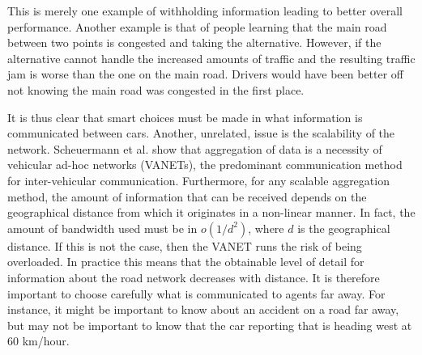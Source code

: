 \documentclass{article}
\begin{document}
This is merely one example of withholding information leading to better overall performance. Another example is that of people learning that the main road between two points is congested and taking the alternative. However, if the alternative cannot handle the increased amounts of traffic and the resulting traffic jam is worse than the one on the main road. Drivers would have been better off not knowing the main road was congested in the first place.

It is thus clear that smart choices must be made in what information is communicated between cars. Another, unrelated, issue is the scalability of the network. Scheuermann et al. \cite{Scheuermann2009} show that aggregation of data is a necessity of vehicular ad-hoc networks (VANETs), the predominant communication method for inter-vehicular communication. Furthermore, for any scalable aggregation method, the amount of information that can be received depends on the geographical distance from which it originates in a non-linear manner. In fact, the amount of bandwidth used must be in $o(1/d^2)$, where $d$ is the geographical distance. If this is not the case, then the VANET runs the risk of being overloaded. In practice this means that the obtainable level of detail for information about the road network decreases with distance. It is therefore important to choose carefully what is communicated to agents far away. For instance, it might be important to know about an accident on a road far away, but may not be important to know that the car reporting that is heading west at 60 km/hour.
\end{document}

